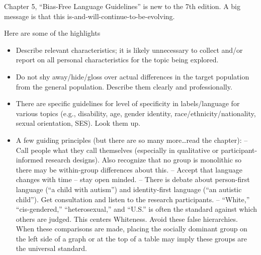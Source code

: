 \documentclass[
  11pt,
]{book}
\providecommand{\tightlist}{%
  \setlength{\itemsep}{0pt}\setlength{\parskip}{0pt}}
\begin{document}
Chapter 5, ``Bias-Free Language Guidelines'' is new to the 7th edition. A big message is that this is-and-will-continue-to-be-evolving.

Here are some of the highlights

\begin{itemize}
\tightlist
\item
  Describe relevant characteristics; it is likely unnecessary to collect and/or report on all personal characteristics for the topic being explored.
\item
  Do not shy away/hide/gloss over actual differences in the target population from the general population. Describe them clearly and professionally.
\item
  There are specific guidelines for level of specificity in labels/language for various topics (e.g., disability, age, gender identity, race/ethnicity/nationality, sexual orientation, SES). Look them up.
\item
  A few guiding principles (but there are so many more\ldots read the chapter):
  -- Call people what they call themselves (especially in qualitative or participant-informed research designs). Also recognize that no group is monolithic so there may be within-group differences about this.
  -- Accept that language changes with time -- stay open minded.
  -- There is debate about person-first language (``a child with autism'') and identity-first language (``an autistic child''). Get consultation and listen to the research participants.
  -- ``White,'' ``cis-gendered,'' ``heterosexual,'' and ``U.S.'' is often the standard against which others are judged. This centers Whiteness. Avoid these false hierarchies. When these comparisons are made, placing the socially dominant group on the left side of a graph or at the top of a table may imply these groups are the universal standard.
\end{itemize}
\end{document}
